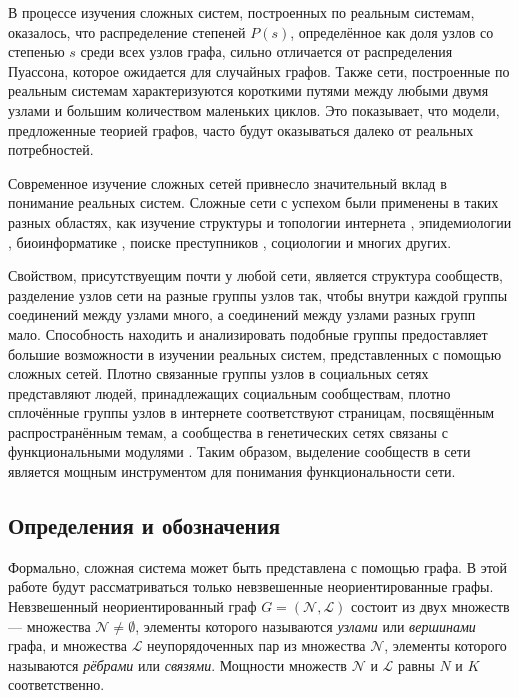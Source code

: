 \documentclass{matmex-diploma}
\begin{document}
В процессе изучения сложных систем, построенных по реальным системам, оказалось, что распределение степеней $P(s)$, определённое как доля узлов со степенью $s$ среди всех узлов графа, сильно отличается от распределения Пуассона, которое ожидается для случайных графов. Также сети, построенные по реальным системам характеризуются короткими путями между любыми двумя узлами и большим количеством маленьких циклов\cite{Boccaletti&al:2006}. Это показывает, что модели, предложенные теорией графов, часто будут оказываться далеко от реальных потребностей.

Современное изучение сложных сетей привнесло значительный вклад в понимание реальных систем. Сложные сети с успехом были применены в таких разных областях, как изучение структуры и топологии интернета \cite{Faloutsos&al:1999, Broder&al:2000}, эпидемиологии \cite{Moore&Newman:2000}, биоинформатике \cite{Zhao&al:2006}, поиске преступников \cite{Hong&al:2009}, социологии \cite{Scott:2012} и многих других.

Свойством, присутствуещим почти у любой сети, является структура сообществ, разделение узлов сети на разные группы узлов так, чтобы внутри каждой группы соединений между узлами много, а соединений между узлами разных групп мало. Способность находить и анализировать подобные группы предоставляет большие возможности в изучении реальных систем, представленных с помощью сложных сетей. Плотно связанные группы узлов в социальных сетях представляют людей, принадлежащих социальным сообществам, плотно сплочённые группы узлов в интернете соответствуют страницам, посвящённым распространённым темам, а сообщества в генетических сетях связаны с функциональными модулями \cite{Boccaletti&al:2006}. Таким образом, выделение сообществ в сети является мощным инструментом для понимания функциональности сети.

\subsection{Определения и обозначения}

Формально, сложная система может быть представлена с помощью графа. В этой работе будут рассматриваться только невзвешенные неориентированные графы. Невзвешенный неориентированный граф $G = (\mathscr{N}, \mathscr{L})$ состоит из двух множеств --- множества $\mathscr{N} \ne \emptyset$, элементы которого называются \emph{узлами} или \emph{вершинами} графа, и множества $\mathscr{L}$ неупорядоченных пар из множества $\mathscr{N}$, элементы которого называются \emph{рёбрами} или \emph{связями}. Мощности множеств $\mathscr{N}$ и $\mathscr{L}$ равны $N$ и $K$ соответственно.
\end{document}
